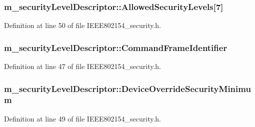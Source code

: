 \subsubsection[{\texorpdfstring{Allowed\+Security\+Levels}{AllowedSecurityLevels}}]{ m\+\_\+security\+Level\+Descriptor\+::\+Allowed\+Security\+Levels\mbox{[}7\mbox{]}}\hypertarget{structm__security_level_descriptor_a099bd48a7add8492359719d9c828afa7}{}\label{structm__security_level_descriptor_a099bd48a7add8492359719d9c828afa7}


Definition at line 50 of file I\+E\+E\+E802154\+\_\+security.\+h.

\subsubsection[{\texorpdfstring{Command\+Frame\+Identifier}{CommandFrameIdentifier}}]{ m\+\_\+security\+Level\+Descriptor\+::\+Command\+Frame\+Identifier}\hypertarget{structm__security_level_descriptor_a551a434a411befedb20f1de326680903}{}\label{structm__security_level_descriptor_a551a434a411befedb20f1de326680903}


Definition at line 47 of file I\+E\+E\+E802154\+\_\+security.\+h.

\subsubsection[{\texorpdfstring{Device\+Override\+Security\+Minimum}{DeviceOverrideSecurityMinimum}}]{ m\+\_\+security\+Level\+Descriptor\+::\+Device\+Override\+Security\+Minimum}\hypertarget{structm__security_level_descriptor_aa48ee7b3f8fdecd586eb0edf50be7c03}{}\label{structm__security_level_descriptor_aa48ee7b3f8fdecd586eb0edf50be7c03}


Definition at line 49 of file I\+E\+E\+E802154\+\_\+security.\+h.

